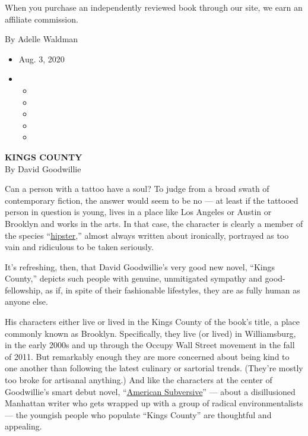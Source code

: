 When you purchase an independently reviewed book through our site, we
earn an affiliate commission.

By Adelle Waldman

\begin{itemize}
\item
  Aug. 3, 2020
\item
  \begin{itemize}
  \item
  \item
  \item
  \item
  \item
  \end{itemize}
\end{itemize}

\textbf{KINGS COUNTY}\\
By David Goodwillie

Can a person with a tattoo have a soul? To judge from a broad swath of
contemporary fiction, the answer would seem to be no --- at least if the
tattooed person in question is young, lives in a place like Los Angeles
or Austin or Brooklyn and works in the arts. In that case, the character
is clearly a member of the species
``\href{https://www.nytimes.com/2010/11/14/books/review/Greif-t.html}{hipster},''
almost always written about ironically, portrayed as too vain and
ridiculous to be taken seriously.

It's refreshing, then, that David Goodwillie's very good new novel,
``Kings County,'' depicts such people with genuine, unmitigated sympathy
and good-fellowship, as if, in spite of their fashionable lifestyles,
they are as fully human as anyone else.

His characters either live or lived in the Kings County of the book's
title, a place commonly known as Brooklyn. Specifically, they live (or
lived) in Williamsburg, in the early 2000s and up through the Occupy
Wall Street movement in the fall of 2011. But remarkably enough they are
more concerned about being kind to one another than following the latest
culinary or sartorial trends. (They're mostly too broke for artisanal
anything.) And like the characters at the center of Goodwillie's smart
debut novel,
``\href{https://www.nytimes.com/2010/05/09/books/review/Watrous-t.html}{American
Subversive}'' --- about a disillusioned Manhattan writer who gets
wrapped up with a group of radical environmentalists --- the youngish
people who populate ``Kings County'' are thoughtful and appealing.

